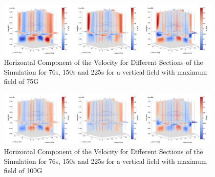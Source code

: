 \documentclass{aastex62}
\begin{document}
\begin{figure}[h]\label{vxplot_bv75g_76_150_225}
\includegraphics[scale=0.15]{imrescale/vx_bv75g_76_150_225.jpg}
\caption{Horizontal Component of the Velocity for Different Sections of the Simulation for 76s, 150s and 225s for a vertical field with maximum field of 75G}
\end{figure}

\begin{figure}[h]\label{vxplot_bv100g_76_150_225}
\includegraphics[scale=0.15]{imrescale/vx_bv100g_76_150_225.jpg}
\caption{Horizontal Component of the Velocity for Different Sections of the Simulation for 76s, 150s and 225s for a vertical field with maximum field of 100G}
\end{figure}




\end{document}
